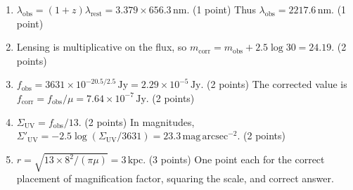 \begin{enumerate}
\item $\lambda_{\mathrm{obs}}=(1+z)\lambda_{\mathrm{rest}}=3.379\times656.3\,\mathrm{nm}$. \hfill(1 point)
Thus $\lambda_{\mathrm{obs}}=2217.6\,\mathrm{nm}$. \hfill(1 point)
\item Lensing is multiplicative on the flux, so $m_{\mathrm{corr}}=m_{\mathrm{obs}}+2.5\log30=24.19$. \hfill(2 points)
\item $f_{\mathrm{obs}}=3631\times10^{-20.5/2.5}\,\mathrm{Jy}=2.29\times10^{-5}\,\mathrm{Jy}$. \hfill(2 points)
The corrected value is $f_{\mathrm{corr}}=f_{\mathrm{obs}}/\mu=7.64\times10^{-7}\,\mathrm{Jy}$. \hfill(2 points)
\item $\Sigma_{\mathrm{UV}}=f_{\mathrm{obs}}/13$. \hfill(2 points)
In magnitudes, $\Sigma'_{\mathrm{UV}}=-2.5\log(\Sigma_{\mathrm{UV}}/3631)=23.3\,\mathrm{mag\,arcsec^{-2}}$. \hfill(2 points)
\item $r=\sqrt{13\times8^2/(\pi\mu)}=3\,\mathrm{kpc}$. \hfill(3 points)
One point each for the correct placement of magnification factor, squaring the scale, and correct answer.
\end{enumerate}
